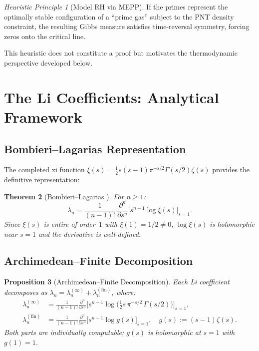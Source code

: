\documentclass[12pt,a4paper]{article}
\newtheorem{theorem}{Theorem}[section]
\newtheorem{proposition}[theorem]{Proposition}
\theoremstyle{definition}
\theoremstyle{remark}
\newtheorem{heuristic}[theorem]{Heuristic Principle}
\begin{document}
\begin{heuristic}[Model RH via MEPP]
If the primes represent the optimally stable configuration of a ``prime gas'' subject to the PNT density constraint, the resulting Gibbs measure satisfies time-reversal symmetry, forcing zeros onto the critical line.
\end{heuristic}

This heuristic does not constitute a proof but motivates the thermodynamic perspective developed below.


\section{The Li Coefficients: Analytical Framework}
\label{sec:li-coefficients}

\subsection{Bombieri--Lagarias Representation}

The completed xi function $\xi(s) = \frac{1}{2}s(s-1)\pi^{-s/2}\Gamma(s/2)\zeta(s)$ provides the definitive representation:

\begin{theorem}[Bombieri--Lagarias \cite{BombieriLagarias1999}]
\label{thm:bombieri-lagarias}
For $n \geq 1$:
\[
\lambda_n = \frac{1}{(n-1)!}\,\frac{\partial^n}{\partial s^n}\Big[s^{n-1}\log\xi(s)\Big]_{s=1}.
\]
Since $\xi(s)$ is entire of order~$1$ with $\xi(1) = 1/2 \neq 0$, $\log\xi(s)$ is holomorphic near $s = 1$ and the derivative is well-defined.
\end{theorem}

\subsection{Archimedean--Finite Decomposition}

\begin{proposition}[Archimedean--Finite Decomposition]
\label{prop:decomposition}
Each Li coefficient decomposes as $\lambda_n = \lambda_n^{(\infty)} + \lambda_n^{(\mathrm{fin})}$, where:
\begin{align}
\lambda_n^{(\infty)} &= \frac{1}{(n-1)!}\frac{\partial^n}{\partial s^n}\Big[s^{n-1}\log\!\big(\tfrac{1}{2}s\,\pi^{-s/2}\,\Gamma(s/2)\big)\Big]_{s=1}, \label{eq:arch-part} \\
\lambda_n^{(\mathrm{fin})} &= \frac{1}{(n-1)!}\frac{\partial^n}{\partial s^n}\Big[s^{n-1}\log g(s)\Big]_{s=1}, \quad g(s) := (s-1)\zeta(s). \label{eq:fin-part}
\end{align}
Both parts are individually computable; $g(s)$ is holomorphic at $s=1$ with $g(1) = 1$.
\end{proposition}
\end{document}
